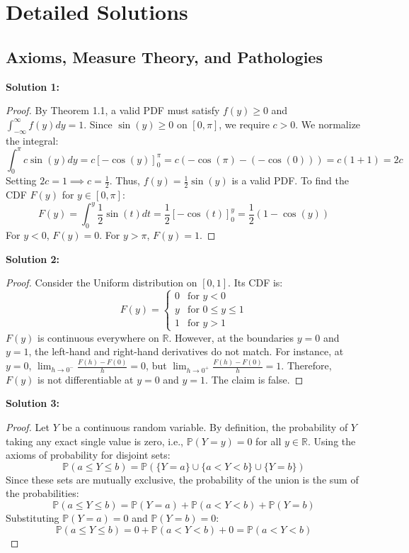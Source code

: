 \documentclass[11pt, a4paper]{article}
\theoremstyle{definition}
\theoremstyle{remark}
\newcommand{\R}{\mathbb{R}}
\newcommand{\Prob}{\mathbb{P}}
\begin{document}
\newpage

\section{Detailed Solutions}

\subsection{Axioms, Measure Theory, and Pathologies}

\textbf{Solution 1:}
\begin{proof}
By Theorem 1.1, a valid PDF must satisfy $f(y) \ge 0$ and $\int_{-\infty}^\infty f(y) dy = 1$. 
Since $\sin(y) \ge 0$ on $[0, \pi]$, we require $c > 0$. We normalize the integral:
\[ \int_0^\pi c \sin(y) dy = c \left[ -\cos(y) \right]_0^\pi = c(-\cos(\pi) - (-\cos(0))) = c(1 + 1) = 2c \]
Setting $2c = 1 \implies c = \frac{1}{2}$. Thus, $f(y) = \frac{1}{2}\sin(y)$ is a valid PDF.
To find the CDF $F(y)$ for $y \in [0, \pi]$:
\[ F(y) = \int_0^y \frac{1}{2}\sin(t) dt = \frac{1}{2} \left[ -\cos(t) \right]_0^y = \frac{1}{2}(1 - \cos(y)) \]
For $y < 0$, $F(y) = 0$. For $y > \pi$, $F(y) = 1$.
\end{proof}

\textbf{Solution 2:}
\begin{proof}
Consider the Uniform distribution on $[0,1]$. Its CDF is:
\[ F(y) = \begin{cases} 0 & \text{for } y < 0 \\ y & \text{for } 0 \le y \le 1 \\ 1 & \text{for } y > 1 \end{cases} \]
$F(y)$ is continuous everywhere on $\R$. However, at the boundaries $y=0$ and $y=1$, the left-hand and right-hand derivatives do not match. For instance, at $y=0$, $\lim_{h \to 0^-} \frac{F(h)-F(0)}{h} = 0$, but $\lim_{h \to 0^+} \frac{F(h)-F(0)}{h} = 1$. Therefore, $F(y)$ is not differentiable at $y=0$ and $y=1$. The claim is false.
\end{proof}

\textbf{Solution 3:}
\begin{proof}
Let $Y$ be a continuous random variable. By definition, the probability of $Y$ taking any exact single value is zero, i.e., $\Prob(Y = y) = 0$ for all $y \in \R$. 
Using the axioms of probability for disjoint sets:
\[ \Prob(a \le Y \le b) = \Prob(\{Y = a\} \cup \{a < Y < b\} \cup \{Y = b\}) \]
Since these sets are mutually exclusive, the probability of the union is the sum of the probabilities:
\[ \Prob(a \le Y \le b) = \Prob(Y = a) + \Prob(a < Y < b) + \Prob(Y = b) \]
Substituting $\Prob(Y = a) = 0$ and $\Prob(Y = b) = 0$:
\[ \Prob(a \le Y \le b) = 0 + \Prob(a < Y < b) + 0 = \Prob(a < Y < b) \]
\end{proof}
\end{document}
